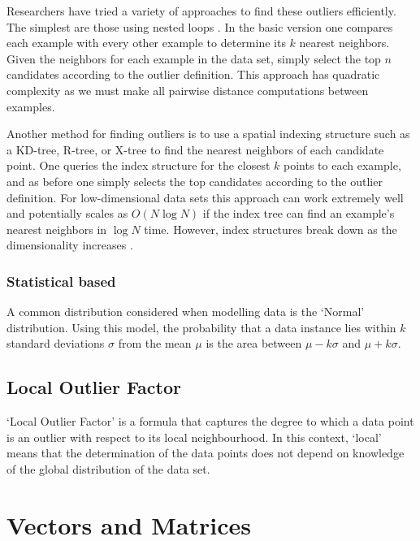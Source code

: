 Researchers have tried a variety of approaches to find these outliers 
efficiently. The simplest are those using nested loops \cite{Bay:2003}. In the 
basic version one compares each example with every other example to determine 
its $k$ nearest neighbors. Given the neighbors for each example in the data set,
simply select the top $n$ candidates according to the outlier definition. This 
approach has quadratic complexity as we must make all pairwise distance 
computations between examples.

Another method for finding outliers is to use a spatial indexing structure such 
as a KD-tree, R-tree, or X-tree to find the nearest neighbors of each candidate 
point. One queries the index structure for the closest $k$ points to each 
example, and as before one simply selects the top candidates according to the 
outlier definition. For low-dimensional data sets this approach can work 
extremely well and potentially scales as $O(N \log N)$ if the index tree can
find an example's nearest neighbors in $\log N$ time. However, index structures 
break down as the dimensionality increases \cite{Bay:2003}.

\subsubsection{Statistical based}
A common distribution considered when modelling data is the `Normal' 
distribution. Using this model, the probability that a data instance lies within
$k$ standard deviations $\sigma$ from the mean $\mu$ is the area between 
$\mu - k\sigma$ and $\mu + k\sigma$.

\subsection{Local Outlier Factor}
\label{sec:localOutlierFactor}
`Local Outlier Factor' is a formula that captures the degree to which a data 
point is an outlier with respect to its local neighbourhood. In this context,
`local' means that the determination of the data points does not depend on 
knowledge of the global distribution of the data set.

\section{Vectors and Matrices}
\label{sec:vectorsAndMatrices}

